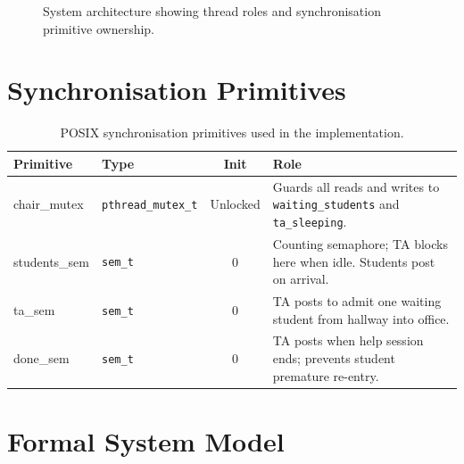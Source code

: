 \documentclass[12pt,a4paper]{report}
\begin{document}
\begin{figure}[H]
  \caption{System architecture showing thread roles and synchronisation primitive ownership.}
  \label{fig:arch}
\end{figure}

\section{Synchronisation Primitives}

\begin{table}[H]
  \centering
  \caption{POSIX synchronisation primitives used in the implementation.}
  \label{tab:prims}
  \begin{tabularx}{\textwidth}{>{\ttfamily}l l c X}
    \toprule
    \normalfont\textbf{Primitive} & \textbf{Type} & \textbf{Init} & \textbf{Role} \\
    \midrule
    chair\_mutex  & \texttt{pthread\_mutex\_t} & Unlocked & Guards all reads and writes to \texttt{waiting\_students} and \texttt{ta\_sleeping}. \\
    students\_sem & \texttt{sem\_t} & 0 & Counting semaphore; TA blocks here when idle. Students post on arrival. \\
    ta\_sem       & \texttt{sem\_t} & 0 & TA posts to admit one waiting student from hallway into office. \\
    done\_sem     & \texttt{sem\_t} & 0 & TA posts when help session ends; prevents student premature re-entry. \\
    \bottomrule
  \end{tabularx}
\end{table}

\section{Formal System Model}
\end{document}
